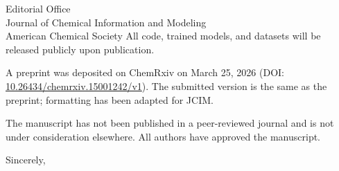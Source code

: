 \documentclass[11pt]{letter}
\begin{document}
\begin{letter}{Editorial Office\\
Journal of Chemical Information and Modeling\\
American Chemical Society}
All code, trained models, and datasets will be released publicly upon publication.

A preprint was deposited on ChemRxiv on March 25, 2026 (DOI: \href{https://doi.org/10.26434/chemrxiv.15001242/v1}{10.26434/chemrxiv.15001242/v1}). The submitted version is the same as the preprint; formatting has been adapted for JCIM.

The manuscript has not been published in a peer-reviewed journal and is not under consideration elsewhere. All authors have approved the manuscript.

\closing{Sincerely,}

\end{letter}
\end{document}
